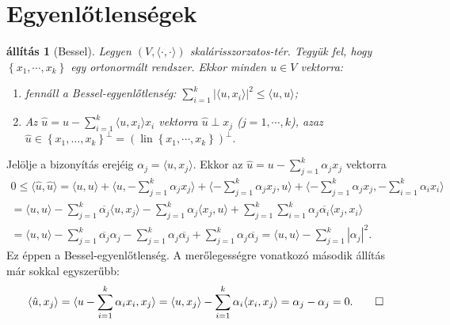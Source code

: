 \documentclass[9pt, a4paper, showtrims]{memoir}
\makeatletter
\renewenvironment{proof}[1][\proofname]
    {\par\pushQED{\qed}%
    \normalfont \topsep6\p@\@plus6\p@\relax
    \trivlist
    \item[\hskip\labelsep
        \itshape
    #1\@addpunct{:}]\ignorespaces}
    {\popQED\endtrivlist\@endpefalse}
\theoremstyle{plain}
\newtheorem{proposition}{állítás}[chapter]
\theoremstyle{remark}
\theoremstyle{definition}
\DeclareMathOperator{\lin}{lin}
\newcommand{\ip}[2]{\langle#1,#2\rangle}
\makeatother
\begin{document}
\section{Egyenlőtlenségek}
\begin{proposition}[Bessel]\label{pr:Bessel}
    Legyen $\left( V,\ip{\cdot}{\cdot} \right)$ skalárisszorzatos-tér.
    Tegyük fel, hogy $\left\{ x_1,\cdots,x_k \right\}$ egy ortonormált rendszer.
    Ekkor minden $u\in V$ vektorra:
    \begin{enumerate}
        \item
            fennáll a  \emph{Bessel-egyenlőtlenség:}
            $\sum_{i=1}^k|\ip{u}{x_i}|^2\leq\ip{u}{u}$; 
        \item
            Az 
            \(
            \hat{u}=u-\sum_{i=1}^k\ip{u}{x_i}x_i
            \) 
            vektorra $\hat{u}\perp x_j$
            ($j=1,\cdots,k$), azaz
            \(
            \hat{u}\in
            \left\{ x_1,\dots,x_k \right\}^\perp
            =
            \left(\lin\left\{ x_1,\cdots,x_k \right\} \right)^\perp.
            \)
            \qedhere
    \end{enumerate}
\end{proposition}
\begin{proof}
    Jelölje a bizonyítás erejéig 
    \begin{math}
        \alpha_j=\ip{u}{x_j}.
    \end{math}
    Ekkor az $\hat{u}=u-\sum_{j=1}^k\alpha_jx_j$ vektorra
    \begin{multline*}
        0
        \leq
        \ip{\hat{u}}{\hat{u}}
        =
        \ip{u}{u}+\ip{u}{-\sum_{j=1}^k\alpha_jx_j}+\ip{-\sum_{j=1}^k\alpha_jx_j}{u}+\ip{-\sum_{j=1}^k\alpha_jx_j}{-\sum_{i=1}^k\alpha_ix_i}
        \\
        =
        \ip{u}{u}-\sum_{j=1}^k\overline{\alpha_j}\ip{u}{x_j}-\sum_{j=1}^k\alpha_j\ip{x_j}{u}+\sum_{j=1}^k\sum_{i=1}^k\alpha_j\overline{\alpha_i}\ip{x_j}{x_i}
        \\
        =
        \ip{u}{u}-\sum_{j=1}^k\overline{\alpha_j}\alpha_j-\sum_{j=1}^k\alpha_j\overline{\alpha_j}+\sum_{j=1}^k\alpha_j\overline{\alpha_j}
        =\ip{u}{u}-\sum_{j=1}^k|\alpha_j|^2.
    \end{multline*}
    Ez éppen a Bessel-egyenlőtlenség.
    A merőlegességre vonatkozó második állítás már sokkal egyszerűbb:
    \[
        \ip{\hat{u}}{x_j}
        =
        \ip{u-\sum_{i=1}^k\alpha_ix_i}{x_j}
        =
        \ip{u}{x_j}-\sum_{i=1}^k\alpha_i\ip{x_i}{x_j}
        =
        \alpha_j-\alpha_j
        =
        0.
        \qedhere
    \]
\end{proof}
\end{document}
